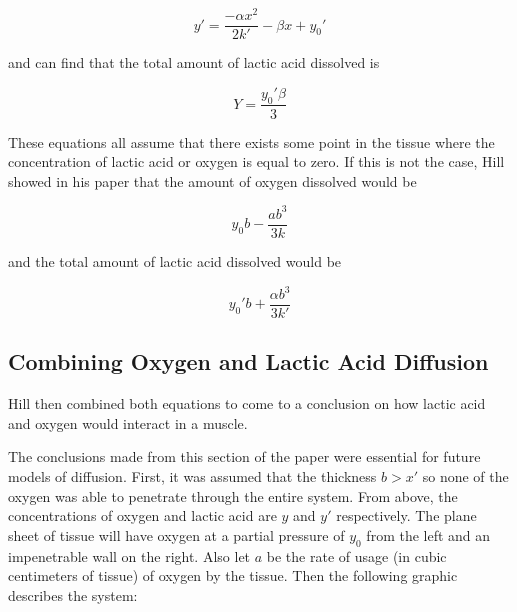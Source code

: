 \documentclass{article}
\begin{document}
\begin{equation}
    y' = \frac{-\alpha x^2}{2k'} - \beta x + y_0'
\end{equation}

and can find that the total amount of lactic acid dissolved is

\begin{equation}
    Y = \frac{y_0' \beta}{3}
\end{equation}

These equations all assume that there exists some point in the tissue where the concentration of lactic acid or oxygen
is equal to zero. If this is not the case, Hill showed in his paper that the amount of oxygen dissolved would be

\begin{equation}
    y_0b - \frac{ab^3}{3k}
\end{equation}

and the total amount of lactic acid dissolved would be

\begin{equation}
    y_0'b + \frac{\alpha b^3}{3k'}
\end{equation}

\subsection{Combining Oxygen and Lactic Acid Diffusion}

Hill then combined both equations to come to a conclusion on how lactic acid and oxygen would interact in a muscle.

The conclusions made from this section of the paper were essential for future models of diffusion. First, it was
assumed that the thickness $b > x'$ so none of the oxygen was able to penetrate through the entire system. From above,
the concentrations of oxygen and lactic acid are $y$ and $y'$ respectively. The plane sheet of tissue will have oxygen
at a partial pressure of $y_0$ from the left and an impenetrable wall on the right. Also let $a$ be the rate of usage
(in cubic centimeters of tissue) of oxygen by the tissue.
Then the following graphic describes the system:
\end{document}
